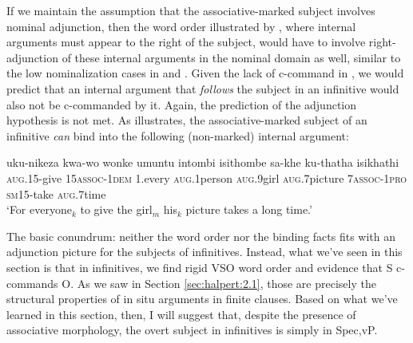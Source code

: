 \documentclass[output=paper,colorlinks,citecolor=brown]{langscibook}
\begin{document}
\ea%
    \label{ex:halpert:16}
    \z 
\z 

If we maintain the assumption that the associative-marked subject involves nominal adjunction, then the word order illustrated by , where internal arguments must appear to the right of the subject, would have to involve right-adjunction of these internal arguments in the nominal domain as well, similar to the low nominalization cases in  and .  Given the lack of c-command in , we would predict that an internal argument that \textit{follows} the subject in an infinitive would also not be c-commanded by it. Again, the prediction of the adjunction hypothesis is not met.  As  illustrates, the associative-marked subject of an infinitive \textit{can} bind into the following (non-marked) internal argument:

\ea%
    \label{ex:halpert:17}
    \gll    uku-nikeza kwa-wo wonke umuntu intombi isithombe sa-khe ku-thatha isikhathi\\
            \textsc{aug}.15-give 15\textsc{assoc}-1\textsc{dem} 1.every \textsc{aug}.1person \textsc{aug}.9girl \textsc{aug}.7picture 7\textsc{assoc}-1\textsc{pro} \textsc{sm}15-take \textsc{aug}.7time\\
    \glt    `For everyone$_k$ to give the girl$_m$ his$_k$ picture takes a long time.'
\z 

The basic conundrum: neither the word order nor the binding facts fits with an adjunction picture for the subjects of infinitives.  Instead, what we've seen in this section is that in infinitives, we find rigid VSO word order and evidence that S c-commands O.  As we saw in Section \ref{sec:halpert:2.1}, those are precisely the structural properties of in situ arguments in finite clauses.  Based on what we've learned in this section, then, I will suggest that, despite the presence of associative morphology, the overt subject in infinitives is simply in Spec,vP.
\end{document}
